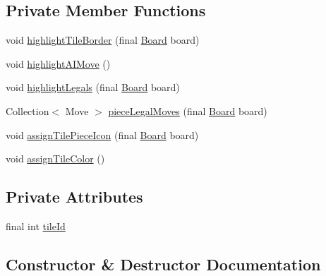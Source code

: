 \subsection*{Private Member Functions}
\begin{DoxyCompactItemize}
\item 
void \mbox{\hyperlink{classcom_1_1chess_1_1gui_1_1_table_1_1_tile_panel_a499bd14dc30e96fc1697917725d03a9a}{highlight\+Tile\+Border}} (final \mbox{\hyperlink{classcom_1_1chess_1_1engine_1_1classic_1_1board_1_1_board}{Board}} board)
\item 
void \mbox{\hyperlink{classcom_1_1chess_1_1gui_1_1_table_1_1_tile_panel_a9c99f8bd778d1597e4cab27020ccc9e9}{highlight\+A\+I\+Move}} ()
\item 
void \mbox{\hyperlink{classcom_1_1chess_1_1gui_1_1_table_1_1_tile_panel_a9cf7b1751d095fb76ee753312410274d}{highlight\+Legals}} (final \mbox{\hyperlink{classcom_1_1chess_1_1engine_1_1classic_1_1board_1_1_board}{Board}} board)
\item 
Collection$<$ Move $>$ \mbox{\hyperlink{classcom_1_1chess_1_1gui_1_1_table_1_1_tile_panel_ac4dca1de5fb6d8e6139f64fccafba586}{piece\+Legal\+Moves}} (final \mbox{\hyperlink{classcom_1_1chess_1_1engine_1_1classic_1_1board_1_1_board}{Board}} board)
\item 
void \mbox{\hyperlink{classcom_1_1chess_1_1gui_1_1_table_1_1_tile_panel_a654736911aa6bc9af91ba9c80487da74}{assign\+Tile\+Piece\+Icon}} (final \mbox{\hyperlink{classcom_1_1chess_1_1engine_1_1classic_1_1board_1_1_board}{Board}} board)
\item 
void \mbox{\hyperlink{classcom_1_1chess_1_1gui_1_1_table_1_1_tile_panel_a443bd1bd2601f8609cedd9c0d10dd0c8}{assign\+Tile\+Color}} ()
\end{DoxyCompactItemize}
\subsection*{Private Attributes}
\begin{DoxyCompactItemize}
\item 
final int \mbox{\hyperlink{classcom_1_1chess_1_1gui_1_1_table_1_1_tile_panel_a0ff1e0f6414184421961bfa3f8e271fa}{tile\+Id}}
\end{DoxyCompactItemize}


\subsection{Constructor \& Destructor Documentation}
\mbox{\label{classcom_1_1chess_1_1gui_1_1_table_1_1_tile_panel_a5866977e98811225c357972cae61650e}} 
